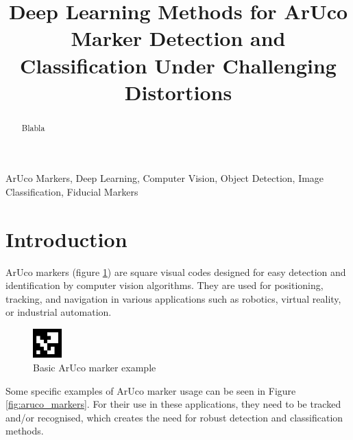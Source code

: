 \documentclass[conference]{IEEEtran}
\begin{document}
\title{Deep Learning Methods for ArUco Marker Detection and Classification Under Challenging Distortions}

\author{
}

\maketitle
\begin{abstract}

Blabla

\end{abstract}

\begin{IEEEkeywords}
ArUco Markers, Deep Learning, Computer Vision, Object Detection, Image Classification, Fiducial Markers
\end{IEEEkeywords}

\section{Introduction}

ArUco markers (figure \ref{fig:aruco_marker_basic}) are square visual codes designed for easy detection and identification by computer vision algorithms. 
They are used for positioning, tracking, and navigation in various applications such as robotics, virtual reality, or industrial automation.

\begin{figure}[h]
    \centering
    \includegraphics[width=0.1\textwidth]{images/aruco-marker-1.png}
    \caption{Basic ArUco marker example}
    \label{fig:aruco_marker_basic}
\end{figure}

Some specific examples of ArUco marker usage can be seen in Figure \ref{fig:aruco_markers}. For their use in these applications, 
they need to be tracked and/or recognised, which creates the need for robust detection and classification methods.
\end{document}

